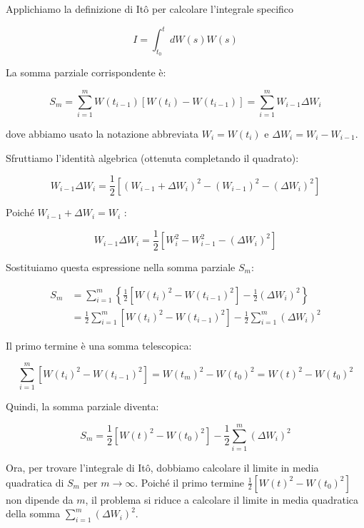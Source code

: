 Applichiamo la definizione di Itô per calcolare l'integrale specifico 


\begin{equation}  I = \int_{t_0}^{t} dW(s) W(s) \end{equation}


La somma parziale corrispondente è:


\begin{equation} 
S_m = \sum_{i=1}^{m} W(t_{i-1}) [W(t_i) - W(t_{i-1})] = \sum_{i=1}^{m} W_{i-1} \Delta W_i
\end{equation}


dove abbiamo usato la notazione abbreviata $W_i = W(t_i)$ e $\Delta W_i = W_i - W_{i-1}$.

Sfruttiamo l'identità algebrica (ottenuta completando il quadrato):

$$
W_{i-1}\Delta W_i = \frac{1}{2}[(W_{i-1}+\Delta W_i)^2 - (W_{i-1})^2 - (\Delta W_i)^2]
$$

Poiché $W_{i-1}+\Delta W_i = W_i$ :


\begin{equation}
W_{i-1}\Delta W_i = \frac{1}{2}[W_i^2 - W_{i-1}^2 - (\Delta W_i)^2]
\end{equation}


Sostituiamo questa espressione nella somma parziale $S_m$:


\begin{align}
S_m &= \sum_{i=1}^{m} \left\{ \frac{1}{2} [ W(t_i)^2 - W(t_{i-1})^2 ] - \frac{1}{2} (\Delta W_i)^2 \right\} \\
&= \frac{1}{2} \sum_{i=1}^{m} [ W(t_i)^2 - W(t_{i-1})^2 ] - \frac{1}{2} \sum_{i=1}^{m} (\Delta W_i)^2 
\end{align}


Il primo termine è una somma telescopica:

$$
 \sum_{i=1}^{m} [ W(t_i)^2 - W(t_{i-1})^2 ] = W(t_m)^2 - W(t_0)^2 = W(t)^2 - W(t_0)^2 
$$

Quindi, la somma parziale diventa:


\begin{equation} 
S_m = \frac{1}{2} [W(t)^2 - W(t_0)^2] - \frac{1}{2} \sum_{i=1}^{m} (\Delta W_i)^2
\end{equation}


Ora, per trovare l'integrale di Itô, dobbiamo calcolare il limite in media quadratica di $S_m$ per $m \to \infty$. Poiché il primo termine $\frac{1}{2} [W(t)^2 - W(t_0)^2]$ non dipende da $m$, il problema si riduce a calcolare il limite in media quadratica della somma $\sum_{i=1}^{m} (\Delta W_i)^2$.


